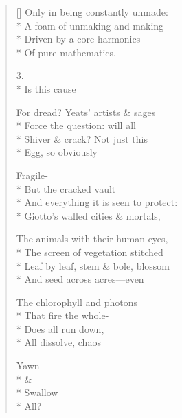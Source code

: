 \begin{verse}[\versewidth]
Only in being constantly unmade:\\*
A foam of unmaking and making\\*
Driven by a core harmonics\\*
Of pure mathematics.

3.\\*
                              Is this cause

For dread? Yeats' artists \& sages\\*
Force the question: will all\\*
Shiver \& crack?  Not just this \\*
Egg, so obviously

Fragile-\\*
But the cracked vault\\*
And everything it is seen to protect:\\*
Giotto's walled cities \& mortals,

The animals with their human eyes,\\*
The screen of vegetation stitched\\*
Leaf by leaf, stem \& bole, blossom\\*
And seed across acres---even 

The chlorophyll and photons\\*
That fire the whole-\\*
Does all run down,\\*
All dissolve, chaos

Yawn\\*
\& \\*
Swallow\\*
All?
\end{verse}
